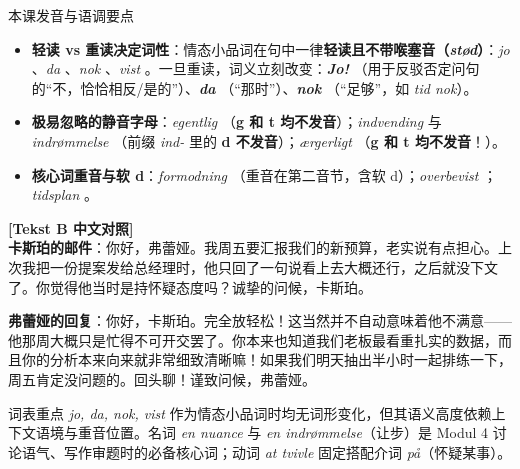 \begin{tipbox}{本课发音与语调要点}
\begin{itemize}
  \item \textbf{轻读 vs 重读决定词性}：情态小品词在句中一律\textbf{轻读且不带喉塞音（\textit{stød}）}：\textit{jo} 、\textit{da} 、\textit{nok} 、\textit{vist} 。一旦重读，词义立刻改变：\textit{\textbf{Jo!}} （用于反驳否定问句的“不，恰恰相反/是的”）、\textit{\textbf{da}} （“那时”）、\textit{\textbf{nok}} （“足够”，如 \textit{tid nok}）。
  \item \textbf{极易忽略的静音字母}：\textit{egentlig} （\textbf{g 和 t 均不发音}）；\textit{indvending}  与 \textit{indrømmelse} （前缀 \textit{ind-} 里的 \textbf{d 不发音}）；\textit{ærgerligt} （\textbf{g 和 t 均不发音}！）。
  \item \textbf{核心词重音与软 d}：\textit{formodning} （重音在第二音节，含软 d）；\textit{overbevist} ；\textit{tidsplan} 。
\end{itemize}
\end{tipbox}

\begin{transbox}
\small
\textbf{\color{NCDTeal}[Tekst B 中文对照]}\\
\textbf{卡斯珀的邮件}：你好，弗蕾娅。我周五要汇报我们的新预算，老实说有点担心。上次我把一份提案发给总经理时，他只回了一句说看上去大概还行，之后就没下文了。你觉得他当时是持怀疑态度吗？诚挚的问候，卡斯珀。

\textbf{弗蕾娅的回复}：你好，卡斯珀。完全放轻松！这当然并不自动意味着他不满意——他那周大概只是忙得不可开交罢了。你本来也知道我们老板最看重扎实的数据，而且你的分析本来向来就非常细致清晰嘛！如果我们明天抽出半小时一起排练一下，周五肯定没问题的。回头聊！谨致问候，弗蕾娅。
\end{transbox}


\begin{tipbox}{词表重点}
\textit{jo, da, nok, vist} 作为情态小品词时均无词形变化，但其语义高度依赖上下文语境与重音位置。名词 \textit{en nuance} 与 \textit{en indrømmelse}（让步）是 Modul 4 讨论语气、写作审题时的必备核心词；动词 \textit{at tvivle} 固定搭配介词 \textit{på}（怀疑某事）。
\end{tipbox}

